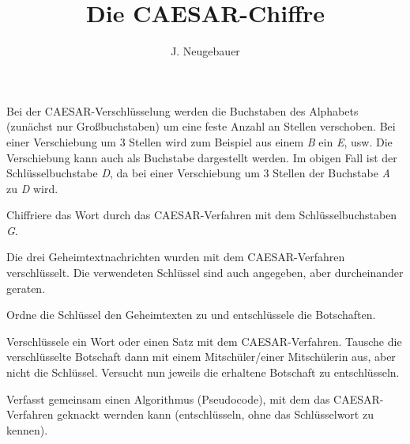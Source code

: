 \documentclass[10pt, a4paper]{scrartcl}
\author{J. Neugebauer}
\title{Die CAESAR-Chiffre}
\date{\Heute}
\begin{document}
\ReiheTitel

Bei der CAESAR-Verschlüsselung werden die Buchstaben des Alphabets (zunächst nur Großbuchstaben) um eine feste Anzahl an Stellen verschoben. Bei einer Verschiebung um 3 Stellen wird zum Beispiel aus einem \emph{B} ein \emph{E}, usw. Die Verschiebung kann auch als Buchstabe dargestellt werden. Im obigen Fall ist der Schlüsselbuchstabe \emph{D}, da bei einer Verschiebung um 3 Stellen der Buchstabe \emph{A} zu \emph{D} wird.

\begin{aufgabe}
	Chiffriere das Wort  durch das CAESAR-Verfahren mit dem Schlüsselbuchstaben \emph{G}.
\end{aufgabe}


\begin{aufgabe}
	Die drei Geheimtextnachrichten wurden mit dem CAESAR-Verfahren verschlüsselt. Die verwendeten Schlüssel sind auch angegeben, aber durcheinander geraten.
	
	\begin{center}
	\end{center}
	
	Ordne die Schlüssel den Geheimtexten zu und entschlüssele die Botschaften.
\end{aufgabe}

\begin{aufgabe}
	Verschlüssele ein Wort oder einen Satz mit dem CAESAR-Verfahren. Tausche die verschlüsselte Botschaft dann mit einem Mitschüler/einer Mitschülerin aus, aber nicht die Schlüssel. Versucht nun jeweils die erhaltene Botschaft zu entschlüsseln.
\end{aufgabe}

\begin{aufgabe}
	Verfasst gemeinsam einen Algorithmus (Pseudocode), mit dem das CAESAR-Verfahren geknackt wernden kann (entschlüsseln, ohne das Schlüsselwort zu kennen).
\end{aufgabe}
\end{document}
